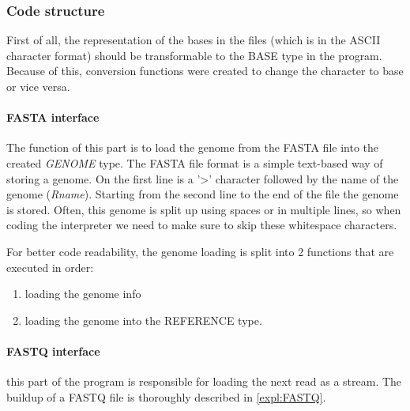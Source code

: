 \subsubsection{Code structure}
\label{codeStructure}

First of all, the representation of the bases in the files (which is in the ASCII character format) should be transformable to the BASE type in the program. Because of this, conversion functions were created to change the character to base or vice versa.

\paragraph{FASTA interface} The function of this part is to load the genome from the FASTA file into the created \emph{GENOME} type. 
The FASTA file format is a simple text-based way of storing a genome. On the first line is a '>' character followed by the name of the genome (\emph{Rname}). Starting from the second line to the end of the file the genome is stored. Often, this genome is split up using spaces or in multiple lines, so when coding the interpreter we need to make sure to skip these whitespace characters.

For better code readability, the genome loading is split into 2 functions that are executed in order:
\begin{enumerate}
	\item loading the genome info
	\item loading the genome into the REFERENCE type. 
\end{enumerate}

\paragraph{FASTQ interface} this part of the program is responsible for loading the next read as a stream. The buildup of a FASTQ file is thoroughly described in \ref{expl:FASTQ}.

